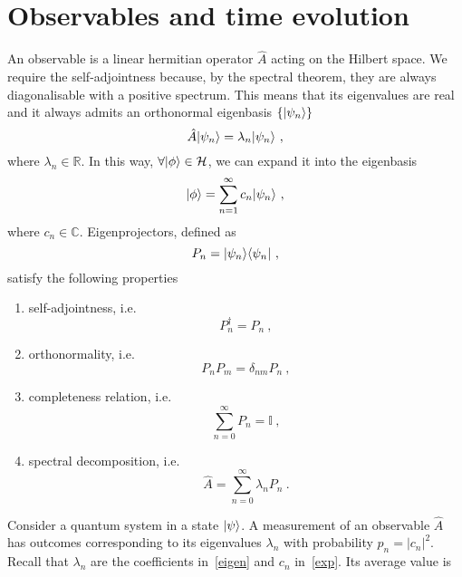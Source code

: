 \section{Observables and time evolution}

    An observable is a linear hermitian operator $\hat A$ acting on the Hilbert space. We require the self-adjointness because, by the spectral theorem, they are always diagonalisable with a positive spectrum. This means that its eigenvalues are real and it always admits an orthonormal eigenbasis $\{\vert\psi_n\rangle\}$
    \begin{equation}\label{eigen}
        \hat A \vert\psi_n\rangle = \lambda_n \vert\psi_n\rangle ~,
    \end{equation}
    where $\lambda_n \in \mathbb R$. In this way, $\forall \vert\phi\rangle \in \mathcal H$, we can expand it into the eigenbasis 
    \begin{equation}\label{exp}
        \vert\phi\rangle = \sum_{n=1}^{\infty} c_n \vert\psi_n\rangle ~,
    \end{equation}
    where $c_n \in \mathbb C$.
    Eigenprojectors, defined as 
    \begin{equation*}
        P_n = \vert\psi_n\rangle \langle\psi_n\vert ~,
    \end{equation*}
    satisfy the following properties 
    \begin{enumerate}
        \item self-adjointness, i.e.
            \begin{equation*}
                P_n^\dagger = P_n ~,
            \end{equation*}
        \item orthonormality, i.e.
            \begin{equation*}
                P_n P_m = \delta_{nm} P_n ~,
            \end{equation*}
        \item completeness relation, i.e.
            \begin{equation}\label{compl}
                \sum_{n = 0}^{\infty} P_n = \mathbb I~,
            \end{equation}
        \item spectral decomposition, i.e.
            \begin{equation}\label{spec}
                \hat A = \sum_{n=0}^{\infty} \lambda_n P_n ~.
            \end{equation}
    \end{enumerate}
    Consider a quantum system in a state $\vert\psi\rangle$. A measurement of an observable $\hat A$ has outcomes corresponding to its eigenvalues $\lambda_n$ with probability $p_n = |c_n|^2$. Recall that $\lambda_n$ are the coefficients in~\eqref{eigen} and $c_n$ in~\eqref{exp}. Its average value is 
